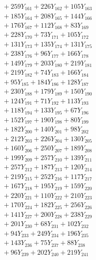 \documentclass[a4paper,10pt]{article}
\begin{document}
{\begin{align}
&\;  + 259 Y_{161} + 226 Y_{162} + 105 Y_{163} \\[0.3ex]
&\;  + 185 Y_{164} + 208 Y_{165} + 144 Y_{166} \\[0.3ex]
&\;  + 176 Y_{167} + 112 Y_{168} + 83 Y_{169} \\[0.3ex]
&\;  + 228 Y_{170} + 73 Y_{171} + 105 Y_{172} \\[0.3ex]
&\;  + 131 Y_{173} + 135 Y_{174} + 131 Y_{175} \\[0.3ex]
&\;  + 238 Y_{176} + 96 Y_{177} + 166 Y_{178} \\[0.5ex]\allowbreak
&\;  + 149 Y_{179} + 203 Y_{180} + 219 Y_{181} \\[0.3ex]
&\;  + 219 Y_{182} + 74 Y_{183} + 166 Y_{184} \\[0.3ex]
&\;  + 95 Y_{185} + 184 Y_{186} + 128 Y_{187} \\[0.3ex]
&\;  + 230 Y_{188} + 179 Y_{189} + 150 Y_{190} \\[0.3ex]
&\;  + 124 Y_{191} + 71 Y_{192} + 113 Y_{193} \\[0.3ex]
&\;  + 118 Y_{194} + 133 Y_{195} + 67 Y_{196} \\[0.3ex]
&\;  + 152 Y_{197} + 190 Y_{198} + 80 Y_{199} \\[0.3ex]
&\;  + 182 Y_{200} + 140 Y_{201} + 98 Y_{202} \\[0.3ex]
&\;  + 212 Y_{203} + 226 Y_{204} + 130 Y_{205} \\[0.3ex]
&\;  + 160 Y_{206} + 250 Y_{207} + 189 Y_{208} \\[0.5ex]\allowbreak
&\;  + 199 Y_{209} + 257 Y_{210} + 139 Y_{211} \\[0.3ex]
&\;  + 257 Y_{212} + 187 Y_{213} + 120 Y_{214} \\[0.3ex]
&\;  + 219 Y_{215} + 252 Y_{216} + 117 Y_{217} \\[0.3ex]
&\;  + 167 Y_{218} + 195 Y_{219} + 159 Y_{220} \\[0.3ex]
&\;  + 220 Y_{221} + 110 Y_{222} + 210 Y_{223} \\[0.3ex]
&\;  + 170 Y_{224} + 182 Y_{225} + 256 Y_{226} \\[0.3ex]
&\;  + 141 Y_{227} + 200 Y_{228} + 238 Y_{229} \\[0.3ex]
&\;  + 201 Y_{230} + 68 Y_{231} + 102 Y_{232} \\[0.3ex]
&\;  + 94 Y_{233} + 249 Y_{234} + 196 Y_{235} \\[0.3ex]
&\;  + 143 Y_{236} + 75 Y_{237} + 88 Y_{238} \\[0.5ex]\allowbreak
&\;  + 96 Y_{239} + 202 Y_{240} + 219 Y_{241} \\[0.3ex]

\end{align}}
\end{document}
